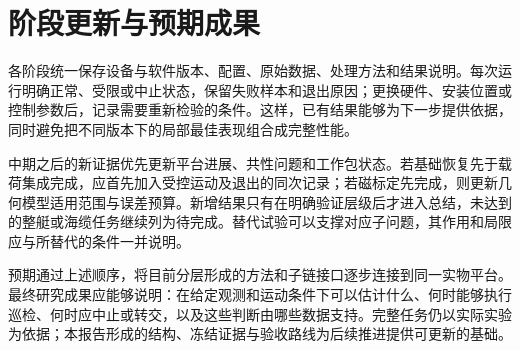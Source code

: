 \endgroup

\section{阶段更新与预期成果}

各阶段统一保存设备与软件版本、配置、原始数据、处理方法和结果说明。每次运行明确正常、受限或中止状态，保留失败样本和退出原因；更换硬件、安装位置或控制参数后，记录需要重新检验的条件。这样，已有结果能够为下一步提供依据，同时避免把不同版本下的局部最佳表现组合成完整性能。

中期之后的新证据优先更新平台进展、共性问题和工作包状态。若基础恢复先于载荷集成完成，应首先加入受控运动及退出的同次记录；若磁标定先完成，则更新几何模型适用范围与误差预算。新增结果只有在明确验证层级后才进入总结，未达到的整艇或海缆任务继续列为待完成。替代试验可以支撑对应子问题，其作用和局限应与所替代的条件一并说明。

预期通过上述顺序，将目前分层形成的方法和子链接口逐步连接到同一实物平台。最终研究成果应能够说明：在给定观测和运动条件下可以估计什么、何时能够执行巡检、何时应中止或转交，以及这些判断由哪些数据支持。完整任务仍以实际实验为依据；本报告形成的结构、冻结证据与验收路线为后续推进提供可更新的基础。
